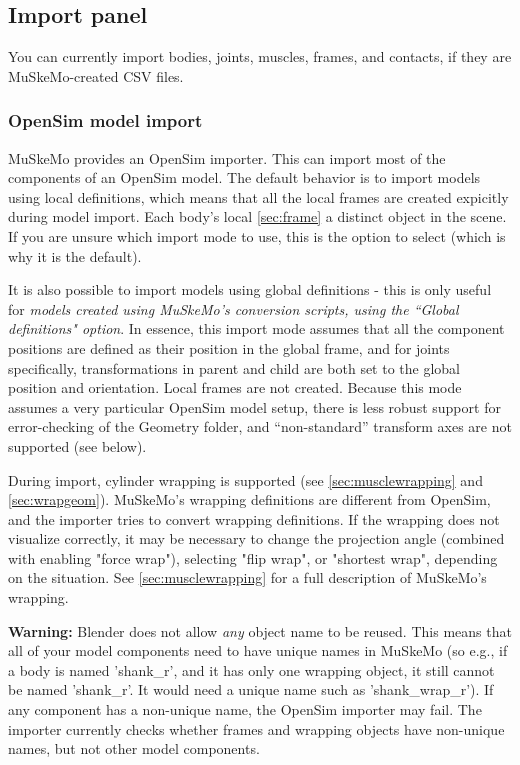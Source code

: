 \documentclass{article}
\begin{document}
\subsection{Import panel}

You can currently import bodies, joints, muscles, frames, and contacts, if they are MuSkeMo-created CSV files.

\subsubsection{OpenSim model import}
\label{sec:opensimimporter}
MuSkeMo provides an OpenSim importer. This can import most of the components of an OpenSim model. The default behavior is to import models using local definitions, which means that all the local frames are created expicitly during model import. Each body's local \ref{sec:frame} a distinct object in the scene. If you are unsure which import mode to use, this is the option to select (which is why it is the default).

It is also possible to import models using global definitions - this is only useful for \textit{models created using MuSkeMo's conversion scripts, using the ``Global definitions" option}. In essence, this import mode assumes that all the component positions are defined as their position in the global frame, and for joints specifically, transformations in parent and child are both set to the global position and orientation. Local frames are not created. Because this mode assumes a very particular OpenSim model setup, there is less robust support for error-checking of the Geometry folder, and ``non-standard'' transform axes are not supported (see below).

During import, cylinder wrapping is supported (see \ref{sec:musclewrapping} and \ref{sec:wrapgeom}). MuSkeMo's wrapping definitions are different from OpenSim, and the importer tries to convert wrapping definitions. If the wrapping does not visualize correctly, it may be necessary to change the projection angle (combined with enabling "force wrap"), selecting "flip wrap", or "shortest wrap", depending on the situation. See \ref{sec:musclewrapping} for a full description of MuSkeMo's wrapping.

\textbf{Warning:} Blender does not allow \textit{any} object name to be reused. This means that all of your model components need to have unique names in MuSkeMo (so e.g., if a body is named 'shank\_r', and it has only one wrapping object, it still cannot be named 'shank\_r'. It would need a unique name such as 'shank\_wrap\_r'). If any component has a non-unique name, the OpenSim importer may fail. The importer currently checks whether frames and wrapping objects have non-unique names, but not other model components.
\end{document}
